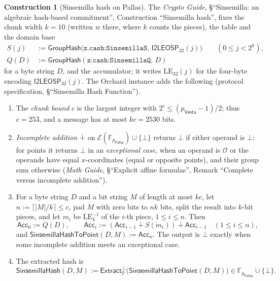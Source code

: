 \documentclass[11pt,a4paper]{article}
\theoremstyle{definition}
\newtheorem{construction}[theorem]{Construction}
\newcommand{\F}{\mathbb{F}}
\newcommand{\PP}{\mathbb{P}}
\newcommand{\Pallas}{\ensuremath{\mathsf{Pallas}}}
\newcommand{\Vesta}{\ensuremath{\mathsf{Vesta}}}
\newcommand{\Ep}{\ensuremath{\mathcal{E}}}
\newcommand{\Extract}{\ensuremath{\mathsf{Extract}}}
\newcommand{\Acc}{\ensuremath{\mathsf{Acc}}}
\newcommand{\GroupHash}{\ensuremath{\mathsf{GroupHash}}}
\begin{document}
\begin{construction}[Sinsemilla hash on Pallas]
The \emph{Crypto Guide}, \S``Sinsemilla: an algebraic hash-based
commitment'', Construction ``Sinsemilla hash'', fixes the chunk width
$k = 10$ (written $w$ there, where $k$ counts the pieces), the table and the
domain base
\begin{align*}
  S(j) &:= \GroupHash\bigl(\texttt{z.cash:SinsemillaS},\,
    \mathsf{I2LEOSP}_{32}(j)\bigr) \qquad (0 \le j < 2^{k}), \\
  Q(D) &:= \GroupHash(\texttt{z.cash:SinsemillaQ},\, D)
\end{align*}
for a byte string $D$, and the accumulator; it writes $\mathrm{LE}_{32}(j)$
for the four-byte encoding $\mathsf{I2LEOSP}_{32}(j)$. The Orchard instance
adds the following (protocol specification, \S``Sinsemilla Hash
Function'').
\begin{enumerate}
\item The \emph{chunk bound} $c$ is the largest integer with
  $2^c \le (p_{\Vesta} - 1)/2$; thus $c = 253$, and a message has at most
  $kc = 2530$ bits.
\item \emph{Incomplete addition} $\dotplus$ on
  $\Ep(\F_{p_{\Pallas}}) \cup \{\bot\}$ returns $\bot$ if either operand is
  $\bot$; for points it returns $\bot$ in an \emph{exceptional case}, when
  an operand is $\mathcal{O}$ or the operands have equal $x$-coordinates
  (equal or opposite points), and their group sum otherwise (\emph{Math
  Guide}, \S``Explicit affine formulas'', Remark ``Complete versus
  incomplete addition'').
\item For a byte string $D$ and a bit string $M$ of length at most $kc$,
  let $n := \lceil |M| / k \rceil \le c$, pad $M$ with zero bits to $nk$
  bits, split the result into $k$-bit pieces, and let $m_i$ be
  $\mathrm{LE}_k^{-1}$ of the $i$-th piece, $1 \le i \le n$. Then
  \[
    \Acc_0 := Q(D), \qquad
    \Acc_i := (\Acc_{i-1} \dotplus S(m_i)) \dotplus \Acc_{i-1}
      \quad (1 \le i \le n),
  \]
  and $\mathsf{SinsemillaHashToPoint}(D, M) := \Acc_n$. The output is
  $\bot$ exactly when some incomplete addition meets an exceptional case.
\item The extracted hash is
  \[
    \mathsf{SinsemillaHash}(D, M) := \Extract_{\PP}^{\bot}\bigl(
      \mathsf{SinsemillaHashToPoint}(D, M)\bigr)
      \in \F_{p_{\Pallas}} \cup \{\bot\}.
  \]
\end{enumerate}
\end{construction}
\end{document}
